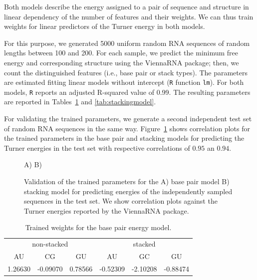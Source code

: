 \documentclass{bioinfo}
\makeatletter
\newlength{\@aligneps}
\newcommand{\includegraphicstop}[2][]{%
\sbox{\@alignepsbox}{\texttt{[image: \#2]}}%
\setlength{\@aligneps}{-\ht\@alignepsbox}%
\addtolength{\@aligneps}{2ex}%
\raisebox{\@aligneps}{\usebox{\@alignepsbox}}}
\makeatother
\begin{document}
Both models describe the energy assigned to a pair of sequence and
structure in linear dependency of the number of features and their
weights. We can thus train weights for linear predictors of the Turner
energy in both models.

For this purpose, we generated 5000 uniform random RNA sequences of
random lengths between 100 and 200. For each sample, we predict the
minimum free energy and corresponding structure using the ViennaRNA
package; then, we count the distinguished features (i.e., base pair or
stack types). The parameters are estimated fitting linear models
without intercept (\texttt{R} function \texttt{lm}). For both models,
\texttt{R} reports an adjusted R-squared value of 0.99. The resulting
parameters are reported in Tables~\ref{tab:basepairmodel} and
\ref{tab:stackingmodel}.

For validating the trained parameters, we generate a second
independent test set of random RNA sequences in the same
way. Figure~\ref{fig:training-cor} shows correlation plots for the
trained parameters in the base pair and stacking models for predicting
the Turner energies in the test set with respective correlations of
$0.95$ an $0.94$.

\begin{figure}
  \centering
  A)\includegraphicstop[width=0.4\textwidth,trim=0 0 0 50,clip]{Figs/basepaircor}
  B)\includegraphicstop[width=0.4\textwidth,trim=0 0 0 50,clip]{Figs/stackingcor}
  \caption{Validation of the trained parameters for the A) base pair
    model B) stacking model for predicting energies of the
    independently sampled sequences in the test set. We show
    correlation plots against the Turner energies reported by the
    ViennaRNA package.}
  \label{fig:training-cor}
\end{figure}

\begin{table}
  \centering
  \caption{Trained weights for the base pair energy model.} 
  \label{tab:basepairmodel}
  \begin{tabular}{c@{\quad}c@{\quad}c@{\quad}|@{\quad}c@{\quad}c@{\quad}c}
    \multicolumn{3}{c}{non-stacked} & \multicolumn{3}{c}{stacked}\\ 
    AU      & CG       & GU      & AU       & GC       & GU \\\hline
    1.26630 & -0.09070 & 0.78566 & -0.52309 & -2.10208 & -0.88474
  \end{tabular}
\end{table}

\end{document}
